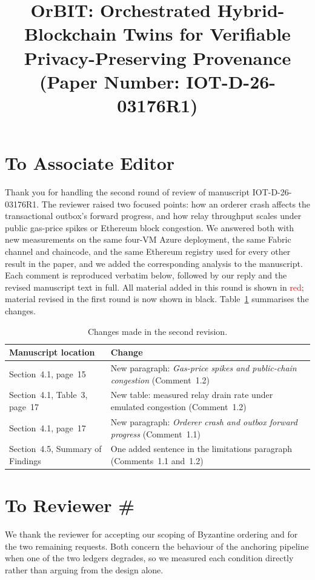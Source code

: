\documentclass[11pt]{article}
\title{OrBIT: Orchestrated Hybrid-Blockchain Twins for Verifiable Privacy-Preserving Provenance \\ (Paper Number: IOT-D-26-03176R1)}
\author{}
\newcounter{reviewer}
\newcounter{point}[reviewer]
\newcommand{\reviewersection}{\stepcounter{reviewer}
                  \section*{To Reviewer \#\thereviewer}}
\newcommand{\editorsection}{\section*{To Associate Editor}}
\newcommand\T{\rule{0pt}{2.5ex}}       %
\newcommand\B{\rule[-1.3ex]{0pt}{0pt}} %
\begin{document}
\maketitle

\vspace{10 pt}

\newpage
\editorsection
\justifying
Thank you for handling the second round of review of manuscript IOT-D-26-03176R1. The reviewer raised two focused points: how an orderer crash affects the transactional outbox's forward progress, and how relay throughput scales under public gas-price spikes or Ethereum block congestion. We answered both with new measurements on the same four-VM Azure deployment, the same Fabric channel and chaincode, and the same Ethereum registry used for every other result in the paper, and we added the corresponding analysis to the manuscript. Each comment is reproduced verbatim below, followed by our reply and the revised manuscript text in full. All material added in this round is shown in \textcolor{red}{red}; material revised in the first round is now shown in black. Table~\ref{edited} summarises the changes.

\begin{table}[!thbp]
\caption{Changes made in the second revision.}
\label{edited}
\centering
\begin{tabular}{p{}|p{}}
\hline\hline
Manuscript location & Change\T\B\\ \hline\hline
Section~4.1, page~15 & New paragraph: \emph{Gas-price spikes and public-chain congestion} (Comment~1.2)\T\B\\ \hline
Section~4.1, Table~3, page~17 & New table: measured relay drain rate under emulated congestion (Comment~1.2)\T\B\\ \hline
Section~4.1, page~17 & New paragraph: \emph{Orderer crash and outbox forward progress} (Comment~1.1)\T\B\\ \hline
Section~4.5, Summary of Findings & One added sentence in the limitations paragraph (Comments~1.1 and~1.2)\T\B\\ \hline\hline
\end{tabular}
\end{table}

\newpage
\reviewersection

We thank the reviewer for accepting our scoping of Byzantine ordering and for the two remaining requests. Both concern the behaviour of the anchoring pipeline when one of the two ledgers degrades, so we measured each condition directly rather than arguing from the design alone.
\end{document}
